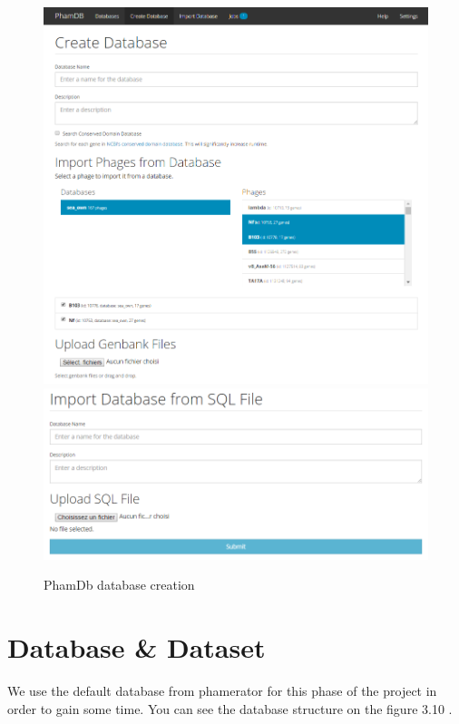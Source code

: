 \documentclass[a4paper,11pt]{report}
\begin{document}
\begin{figure}[H] 
	\begin{center}
		\includegraphics[scale=0.45]{img/phamdb_create_db}
		\includegraphics[scale=0.45]{img/phamdb_create_db_2}
		\caption{PhamDb database creation}
	\end{center}
\end{figure}
\newpage
\section{Database \& Dataset}
We use the default database from phamerator for this phase of the project in order to gain some time. You can see the database structure on the figure 3.10 .
\end{document}
